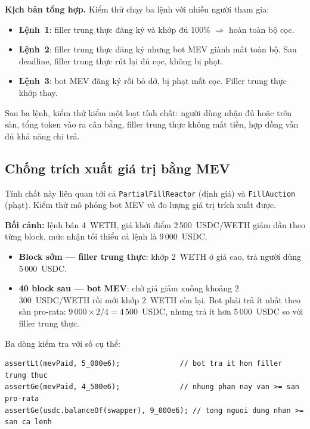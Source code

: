 \documentclass[../DoAn.tex]{subfiles}
\begin{document}
\textbf{Kịch bản tổng hợp.} Kiểm thử  chạy ba lệnh với nhiều người tham gia:

\begin{itemize}
    \item \textbf{Lệnh~1}: filler trung thực đăng ký và khớp đủ 100\% $\Rightarrow$ hoàn toàn bộ cọc.
    \item \textbf{Lệnh~2}: filler trung thực đăng ký nhưng bot MEV giành mất toàn bộ. Sau deadline, filler trung thực rút lại đủ cọc, không bị phạt.
    \item \textbf{Lệnh~3}: bot MEV đăng ký rồi bỏ dở, bị phạt mất cọc. Filler trung thực khớp thay.
\end{itemize}

Sau ba lệnh, kiểm thử kiểm một loạt tính chất: người dùng nhận đủ hoặc trên sàn, tổng token vào ra cân bằng, filler trung thực không mất tiền, hợp đồng vẫn đủ khả năng chi trả.

\subsection{Chống trích xuất giá trị bằng MEV}

Tính chất này liên quan tới cả \texttt{PartialFillReactor} (định giá) và \texttt{FillAuction} (phạt). Kiểm thử  mô phỏng bot MEV và đo lượng giá trị trích xuất được.

\textbf{Bối cảnh:} lệnh bán 4~WETH, giá khởi điểm 2\,500~USDC/WETH giảm dần theo từng block, mức nhận tối thiểu cả lệnh là 9\,000~USDC.

\begin{itemize}
    \item \textbf{Block sớm --- filler trung thực}: khớp 2~WETH ở giá cao, trả người dùng 5\,000~USDC.
    \item \textbf{40 block sau --- bot MEV}: chờ giá giảm xuống khoảng 2\,300~USDC/WETH rồi mới khớp 2~WETH còn lại. Bot phải trả ít nhất theo sàn pro-rata: $9\,000 \times 2/4 = 4\,500$~USDC, nhưng trả ít hơn 5\,000~USDC so với filler trung thực.
\end{itemize}

Ba dòng kiểm tra với số cụ thể:

\begin{lstlisting}
assertLt(mevPaid, 5_000e6);              // bot tra it hon filler trung thuc
assertGe(mevPaid, 4_500e6);              // nhung phan nay van >= san pro-rata
assertGe(usdc.balanceOf(swapper), 9_000e6); // tong nguoi dung nhan >= san ca lenh
\end{lstlisting}
\end{document}
